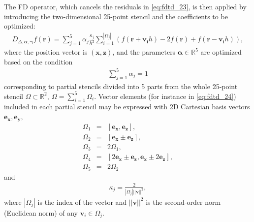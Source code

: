             The FD operator, which cancels the residuals in \ref{eq:fdtd_23}, is then applied by introducing the two-dimensional 25-point stencil
and the coefficients to be optimized:
            \begin{align} \label{eq:fdtd_24}
                D_{\Delta,\bm{\alpha},\bm{\gamma}}f(\bm{r})=\sum^5_{j=1}\alpha_j \frac{\kappa_j}{h^2}\sum^{|\Omega_j|}_{i=1}
\left(f(\bm{r}+\bm{v_i}h)-2f(\bm{r})+f(\bm{r}-\bm{v_i}h)\right),
            \end{align}
            where the position vector is $\bm{(x,z)}$, and the parameters $\bm{\alpha}\in\mathbb{R}^5$ are optimized based on the condition
            \begin{align} \label{eq:fdtd_25}
                \sum^5_{j=1}\alpha_j=1
            \end{align}
            corresponding to partial stencils divided into 5 parts from the whole 25-point stencil $\Omega\subset\mathbb{R}^2,\ \Omega=\sum^5_{i=1}\Omega_i$.
            Vector elements (for instance in \ref{eq:fdtd_24}) included in each partial stencil may be expressed with 2D Cartesian basis vectors $\bm{e_x},\bm{e_y}$,
            \begin{align} \label{eq:fdtd_26}
                \Omega_1 &=& \left[ \bm{e_x}, \bm{e_z} \right],\nonumber \\
                \Omega_2 &=& \left[ \bm{e_x}\pm\bm{e_z} \right],\nonumber \\
                \Omega_3 &=& 2\Omega_1, \nonumber \\
                \Omega_4 &=& \left[ 2\bm{e_x}\pm\bm{e_z}, \bm{e_x}\pm2\bm{e_z} \right], \nonumber \\
                \Omega_5 &=& 2\Omega_2
            \end{align}
            and
            \begin{align} \label{eq:fdtd_27}
                \kappa_j = \frac{2}{|\Omega_j| ||\bm{v}||^2},
            \end{align}
            where $|\Omega_j|$ is the index of the vector and $||\bm{v}||^2$ is the second-order norm (Euclidean norm) of any $\bm{v}_i \in \Omega_j$.

